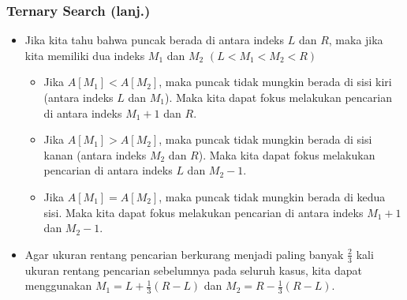 \begin{frame}
\frametitle{Ternary Search (lanj.)}
\begin{itemize}
  \item Jika kita tahu bahwa puncak \farray berada di antara indeks $L$ dan $R$, maka jika kita memiliki dua indeks $M_1$ dan $M_2$ $(L < M_1 < M_2 < R)$
  \begin{itemize}
    \item Jika $A[M_1] < A[M_2]$, maka puncak \farray tidak mungkin berada di sisi kiri (antara indeks $L$ dan $M_1$). Maka kita dapat fokus melakukan pencarian di antara indeks $M_1 + 1$ dan $R$.
    \item Jika $A[M_1] > A[M_2]$, maka puncak \farray tidak mungkin berada di sisi kanan (antara indeks $M_2$ dan $R$). Maka kita dapat fokus melakukan pencarian di antara indeks $L$ dan $M_2 - 1$.
    \item Jika $A[M_1] = A[M_2]$, maka puncak \farray tidak mungkin berada di kedua sisi. Maka kita dapat fokus melakukan pencarian di antara indeks $M_1 + 1$ dan $M_2 - 1$.
  \end{itemize}
  \item Agar ukuran rentang pencarian berkurang menjadi paling banyak $\frac{2}{3}$ kali ukuran rentang pencarian sebelumnya pada seluruh kasus, kita dapat menggunakan $M_1 = L + \frac{1}{3}(R - L)$ dan $M_2 = R - \frac{1}{3}(R - L)$.
\end{itemize}
\end{frame}


